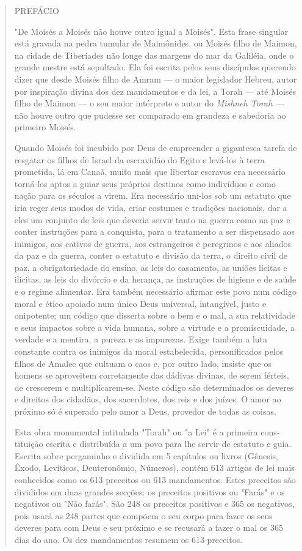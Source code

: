 \begin{quote}
PREFÁCIO

"De Moisés a Moisés não houve outro igual a Moisés". Esta frase
singu­lar está gravada na pedra tumular de Maimônides, ou Moisés filho
de Maimon, na cidade de Tiberíades não longe das margens do mar da
Galiléia, onde o grande mestre está sepultado. Ela foi escrita pelos
seus discípulos querendo dizer que desde Moi­sés filho de Amram --- o
maior legislador Hebreu, autor por inspiração divina dos dez mandamentos
e da lei, a Torah --- até Moisés filho de Maimon --- o seu maior
intérprete e autor do \emph{Mishneh Torah ---} não houve outro que
pudesse ser compara­do em grandeza e sabedoria ao primeiro Moisés.

Quando Moisés foi incubido por Deus de empreender a gigantesca tare­fa
de resgatar os filhos de Israel da escravidão do Egito e levá-los à
terra prometida, lá em Canaã, muito mais que libertar escravos era
necessário torná-los aptos a guiar seus próprios destinos como
indivíduos e como nação para os séculos a virem. Era necessário uní-los
sob um estatuto que iria reger seus modos de vida, criar costu­mes e
tradições nacionais, dar a eles um conjunto de leis que deveria servir
tanto na guerra como na paz e conter instruções para a conquista, para o
tratamento a ser dispensado aos inimigos, aos cativos de guerra, aos
estrangeiros e peregrinos e aos aliados da paz e da guerra, conter o
estatuto e divisão da terra, o direito civil de paz, a obrigatoriedade
do ensino, as leis do casamento, as uniões lícitas e ilícitas, as leis
do divórcio e da herança, as instruções de higiene e de saúde e o regime
alimentar. Era também necessário afirmar este povo num código moral e
ético apoia­do num único Deus universal, intangível, justo e onipotente;
um código que dis­serta sobre o bem e o mal, a sua relatividade e seus
impactos sobre a vida humana, sobre a virtude e a promiscuidade, a
verdade e a mentira, a pureza e as impurezas. Exige também a luta
constante contra os inimigos da moral estabelecida, personifi­cados
pelos filhos de Amalec que cultuam o caos e, por outro lado, insiste que
os homens se aproveitem corretamente das dádivas divinas, de serem
férteis, de cres­cerem e multiplicarem-se. Neste código são determinados
os deveres e direitos dos cidadãos, dos sacerdotes, dos reis e dos
juízes. O amor ao próximo só é superado pelo amor a Deus, provedor de
todas as coisas.

Esta obra monumental intitulada "Torah" ou "a Lei" é a primeira
cons­tituição escrita e distribuída a um povo para lhe servir de
estatuto e guia. Escrita sobre pergaminho e dividida em 5 capítulos ou
livros (Gênesis, Êxodo, Levíticos, Deuteronômio, Números), contém 613
artigos de lei mais conhecidos como os 613 preceitos ou 613 mandamentos.
Estes preceitos são divididos em duas grandes sec­ções: os preceitos
positivos ou "Farás" e os negativos ou "Não farás". São 248 os preceitos
positivos e 365 os negativos, pois usará as 248 partes que compõem o seu
corpo para fazer os seus deveres para com Deus e seu próximo e se
recusará a fazer o mal os 365 dias do ano. Os dez mandamentos resumem os
613 preceitos.


\end{quote}
